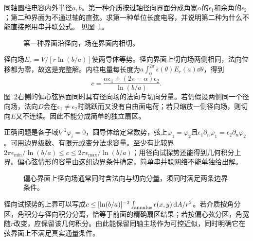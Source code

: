 \begin{example}[分区圆柱电容与偏心弦界面]\label{ex:es4-e8}
同轴圆柱电容内外半径$a,b$。第一种介质按过轴径向界面分成角宽$\alpha$的$\epsilon_1$和余角的$\epsilon_2$；第二种界面为不通过轴的直弦。求第一种单位长度电容，并说明第二种为什么不能直接照用串并联公式。 见图~\ref{fig:es4-e8-q}。
\end{example}

\begin{figure}[H]\centering
{}
\caption{第一种界面沿径向，场在界面内相切。}\label{fig:es4-e8-q}
\end{figure}
\begin{solution}
径向场$E_r=V/[r\ln(b/a)]$使两导体等势。径向界面上切向场两侧相同，法向位移都为零，故这是完整解。内柱电量每长度为$a\int_0^{2\pi}\epsilon(\theta)E_r(a)\dd\theta$，得到
\[\boxed{c=\frac{\alpha\epsilon_1+(2\pi-\alpha)\epsilon_2}{\ln(b/a)}}.
\]
图~\ref{fig:es4-e8-s}右侧的偏心弦界面同时具有径向场的法向与切向分量。若仍假设两侧同一个径向场，法向$D$会在$\epsilon_1\ne\epsilon_2$时跳跃而又没有自由面电荷；若只缩放一侧径向场，则切向$E$又不连续。因此不能分成简单的独立扇区。

正确问题是各子域$\nabla^2\varphi_i=0$，圆导体给定常数势，弦上$\varphi_1=\varphi_2$且$\epsilon_1\partial_n\varphi_1=\epsilon_2\partial_n\varphi_2$。可用边界级数、有限元或变分法求容量。至少有比较界$2\pi\epsilon_{\min}/\ln(b/a)\le c\le2\pi\epsilon_{\max}/\ln(b/a)$；用径向试探势还能得到几何积分上界。偏心弦情形的容量由这组边界条件确定，简单串并联网络不能单独给出解。
\begin{figure}[H]\centering
{}
\caption{偏心界面上径向场通常同时含法向与切向分量，须同时满足两条边界条件。}\label{fig:es4-e8-s}
\end{figure}


径向试探势的上界可以写成$c\le[\ln(b/a)]^{-2}\int_{\rm annulus}\epsilon(x,y)\mathop{}\!\mathrm d A/r^2$。若介质按角分区，角积分与径向积分分离，恰等于前面的精确扇区结果；若按偏心弦分区，角宽随$r$改变，应保留该几何积分。由此能保留同轴主场作为可控近似，同时明确它在弦界面上不满足真实通量条件。
\end{solution}

